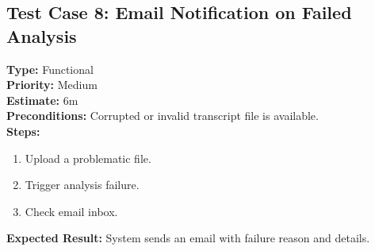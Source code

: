 \documentclass[12pt]{article}
\begin{document}
\subsection*{Test Case 8: Email Notification on Failed Analysis}
\textbf{Type:} Functional \\
\textbf{Priority:} Medium \\
\textbf{Estimate:} 6m \\
\textbf{Preconditions:} Corrupted or invalid transcript file is available. \\
\textbf{Steps:}
\begin{enumerate}[label=\arabic*.]
\item Upload a problematic file.
\item Trigger analysis failure.
\item Check email inbox.
\end{enumerate}
\textbf{Expected Result:} System sends an email with failure reason and details.
\end{document}
